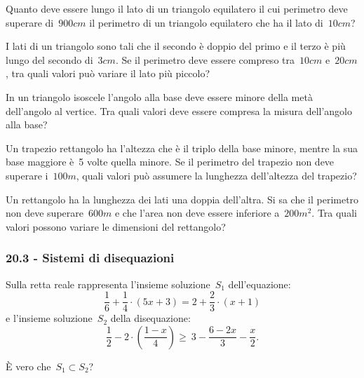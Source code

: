 \begin{multicols}{2}
 \begin{esercizio}[\Ast]
 \label{ese:20.30}
 Quanto deve essere lungo il lato di un triangolo equilatero il cui
perimetro deve superare di~$900\unit{cm}$ il perimetro di un triangolo
equilatero che ha il lato di~$10\unit{cm}$?
 \end{esercizio}

 \begin{esercizio}[\Ast]
 \label{ese:20.31}
 I lati di un triangolo sono tali che il secondo è doppio del primo e
il terzo è più lungo del secondo di~$3\unit{cm}$. Se il perimetro deve
essere compreso tra~$10\unit{cm}$ e~$20\unit{cm}$, tra quali valori può variare il lato
più piccolo?
 \end{esercizio}

 \begin{esercizio}[\Ast]
 \label{ese:20.32}
 In un triangolo isoscele l'angolo
alla base deve essere minore della metà dell'angolo
al vertice. Tra quali valori deve essere compresa la misura
dell'angolo alla base?
 \end{esercizio}

 \begin{esercizio}[\Ast]
 \label{ese:20.33}
 Un trapezio rettangolo ha l'altezza che è il triplo
della base minore, mentre la sua base maggiore è~5 volte quella minore.
Se il perimetro del trapezio non deve superare i~$100\unit{m}$, quali valori
può assumere la lunghezza dell'altezza del
trapezio?
 \end{esercizio}

 \begin{esercizio}[\Ast]
 \label{ese:20.34}
 Un rettangolo ha la lunghezza dei lati una doppia dell'altra.
Si sa che il perimetro non deve superare~$600\unit{m}$ e che
l'area non deve essere inferiore a~$200\unit{m^2}$. Tra quali
valori possono variare le dimensioni del rettangolo?
 \end{esercizio}
\end{multicols}

 \subsubsection*{20.3 - Sistemi di disequazioni}

\begin{esercizio}
 \label{ese:20.35}
Sulla retta reale rappresenta l'insieme soluzione~$S_{1}$
dell'equazione:
\[\frac{1}{6}+\frac{1}{4}\cdot (5x+3)=2+\frac{2}{3}\cdot (x+1)\]
e l'insieme soluzione~$S_{2}$ della disequazione:
\[\frac{1}{2}-2\cdot\left(\frac{1-x}{4}\right)\ge~3-\frac{6-2x}{3}-\frac{x}{2}.\]

È vero che~$S_{1}\subset S_{2}$?
\end{esercizio}

